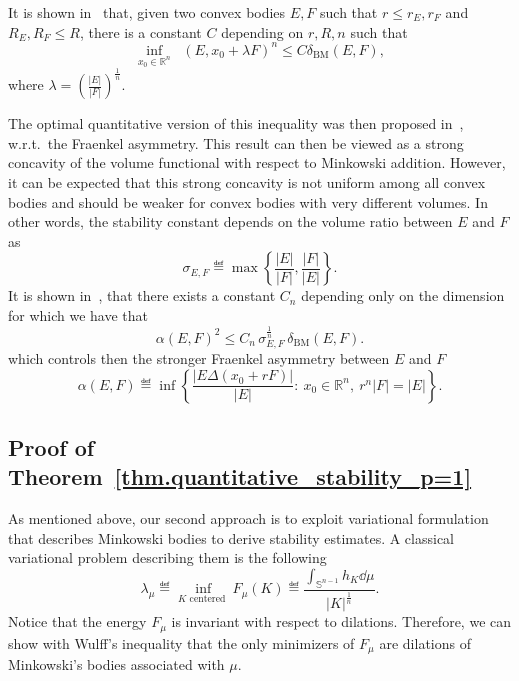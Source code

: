 \documentclass[a4paper, 10pt, twoside]{amsart}
\numberwithin{equation}{section}
\theoremstyle{plain}
\theoremstyle{definition}
\DeclareMathOperator{\BM}{\mathrm{BM}}
\DeclareMathOperator{\dH}{\mathrm{d}_\mathrm{H}}
\begin{document}
It is shown in~\cite{diskant1973stability} that, given two convex bodies $E,F$ such that $r \le r_E, r_F$ and $R_E, R_F \le R$, there is a constant $C$ depending on $r,R,n$ such that 
\begin{equation}\label{eq.diskant_isoperimetric}
    \inf_{x_0 \in \mathbb{R}^n} {\dH(E, x_0 + \lambda F)}^n \le C\delta_{\BM}(E,F), 
\end{equation}
where $\lambda = \left(\frac{|E|}{|F|}\right)^{\frac{1}{n}}$. 

The optimal quantitative version of this inequality was then proposed in~\cite{figalli2010stability}, w.r.t.~the Fraenkel asymmetry. This result can then be viewed as a strong concavity of the volume functional with respect to Minkowski addition. However, it can be expected that this strong concavity is not uniform among all convex bodies and should be weaker for convex bodies with very different volumes. In other words, the stability constant depends on the volume ratio between $E$ and $F$ as
\[
    \sigma_{E,F} 
    \eqdef 
    \max 
    \left\{
      \frac{|E|}{|F|},\frac{|F|}{|E|}  
    \right\}. 
\]
It is shown in~\cite{figalli2010stability}, that there exists a constant $C_n$ depending only on the dimension for which we have that
\begin{equation}\label{eq.quantitative_BM}
    {\alpha(E,F)}^2 \le C_n\,\sigma^{\frac{1}{n}}_{E,F}\,\delta_{\BM}(E,F). 
\end{equation}
which controls then the stronger Fraenkel asymmetry between $E$ and $F$
\begin{equation}\label{eq.quantitative_isoperimetric}
    \alpha(E,F) 
    \eqdef 
    \inf\left\{
        \frac{|E \Delta (x_0 + rF)|}{|E|} : \
        x_0 \in \mathbb{R}^n, \ r^n|F| = |E|    
    \right\}. 
\end{equation}

\subsection{Proof of Theorem~\ref{thm.quantitative_stability_p=1} %
}\label{sec.p=1_variational}

As mentioned above, our second approach is to exploit variational formulation that describes Minkowski bodies to derive stability estimates. A classical variational problem describing them is the following 
\begin{equation}\label{eq.classical_var_Minko}
    \lambda_\mu \eqdef 
    \inf_{K \text{ centered }} 
    F_\mu(K) 
    \eqdef 
    \frac{
        \displaystyle
        \int_{\mathbb{S}^{n-1}} h_K \dd \mu
    }{|K|^{\frac{1}{n}}}.
\end{equation}
Notice that the energy $F_\mu$ is invariant with respect to dilations. Therefore, we can show with Wulff's inequality that the only minimizers of $F_\mu$ are dilations of Minkowski's bodies associated with $\mu$. 
\end{document}
